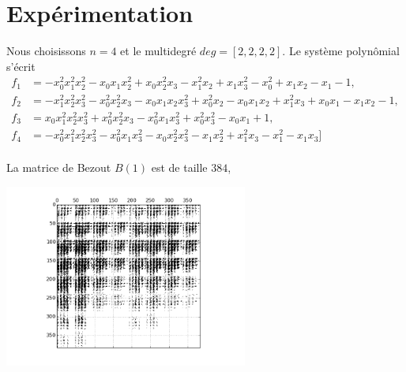 \documentclass{standalone}
\begin{document}
  \section{Expérimentation}
  Nous choisissons $n=4$ et le multidegré $deg=[2,2,2,2]$. Le système polynômial s'écrit
  \begin{align}
  f_1 & =
  -x_0^2x_1^2x_2^2 - x_0x_1x_2^2 + x_0x_2^2x_3 - x_1^2x_2 + x_1x_3^2 - x_0^2 + x_1x_2 - x_1 - 1, \nonumber\\
  f_2 & =
   -x_1^2x_2^2x_3^2 - x_0^2x_2^2x_3 - x_0x_1x_2x_3^2 + x_0^2x_2 - x_0x_1x_2 + x_1^2x_3 + x_0x_1 - x_1x_2 - 1, \nonumber\\
   f_3 & =
   x_0x_1^2x_2^2x_3^2 + x_0^2x_2^2x_3 - x_0^2x_1x_3^2 + x_0^2x_3^2 - x_0x_1 + 1, \nonumber\\
   f_4 & =
   -x_0^2x_1^2x_2^2x_3^2 - x_0^2x_1x_3^2 - x_0x_2^2x_3^2 - x_1x_2^2 + x_1^2x_3 - x_1^2 - x_1x_3] \nonumber\\
   \end{align}

  La matrice de Bezout $B(1)$ est de taille $384$,
   \begin{center}
  \includegraphics[width=8cm]{../png/B0.png}
  \end{center}
\end{document}
